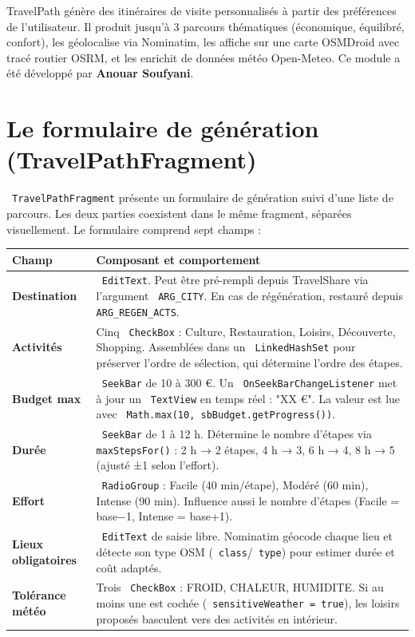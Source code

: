 \documentclass[a4paper,12pt,openany]{report}
\newcommand{\ic}[1]{\texttt{\small\colorbox{lightbg}{\color{navy!90} #1}}}
\begin{document}
TravelPath génère des itinéraires de visite personnalisés à partir des
préférences de l'utilisateur. Il produit jusqu'à 3 parcours thématiques
(économique, équilibré, confort), les géolocalise via Nominatim, les affiche
sur une carte OSMDroid avec tracé routier OSRM, et les enrichit de données
météo Open-Meteo. Ce module a été développé par \textbf{Anouar Soufyani}.

\section{Le formulaire de génération (TravelPathFragment)}

\ic{TravelPathFragment} présente un formulaire de génération suivi d'une liste
de parcours. Les deux parties coexistent dans le même fragment, séparées
visuellement. Le formulaire comprend sept champs :

\begin{tabularx}{\textwidth}{>{\bfseries}l X}
  \toprule
  Champ & Composant et comportement \\
  \midrule
  Destination
    & \ic{EditText}. Peut être pré-rempli depuis TravelShare via l'argument
      \ic{ARG\_CITY}. En cas de régénération, restauré depuis
      \ic{ARG\_REGEN\_ACTS}. \\
  Activités
    & Cinq \ic{CheckBox} : Culture, Restauration, Loisirs, Découverte,
      Shopping. Assemblées dans un \ic{LinkedHashSet} pour préserver l'ordre
      de sélection, qui détermine l'ordre des étapes. \\
  Budget max
    & \ic{SeekBar} de 10 à 300 €. Un \ic{OnSeekBarChangeListener} met à
      jour un \ic{TextView} en temps réel : "XX €". La valeur est lue avec
      \ic{Math.max(10, sbBudget.getProgress())}. \\
  Durée
    & \ic{SeekBar} de 1 à 12 h. Détermine le nombre d'étapes via \ic{maxStepsFor()} :
      2 h → 2 étapes, 4 h → 3, 6 h → 4, 8 h → 5 (ajusté ±1 selon l'effort). \\
  Effort
    & \ic{RadioGroup} : Facile (40 min/étape), Modéré (60 min), Intense (90 min).
      Influence aussi le nombre d'étapes (Facile = base−1, Intense = base+1). \\
  Lieux obligatoires
    & \ic{EditText} de saisie libre. Nominatim géocode chaque lieu et détecte
      son type OSM (\ic{class}/\ic{type}) pour estimer durée et coût adaptés. \\
  Tolérance météo
    & Trois \ic{CheckBox} : FROID, CHALEUR, HUMIDITE. Si au moins une est
      cochée (\ic{sensitiveWeather = true}), les loisirs proposés basculent
      vers des activités en intérieur. \\
  \bottomrule
\end{tabularx}
\end{document}
